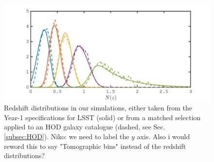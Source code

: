 \begin{figure}
\includegraphics[width=\columnwidth]{graphs/Nz}
\caption{Redshift distributions in our simulations, either taken from the Year-1 specifications for LSST (solid) or from a matched selection applied to an HOD galaxy catalogue (dashed, see Sec. \ref{subsec:HOD}).
{\color{orange}Niko: we need to label the $y$ axis. Also i would reword this to say "Tomographic bins" instead of the redshift distributions?}}
\label{fig:Nz}
\end{figure}